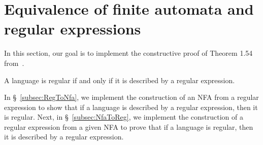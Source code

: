 \section{Equivalence of finite automata and regular expressions}\label{sec:equivalence_regex_fa}

In this section, our goal is to implement the constructive proof of Theorem 1.54 from~\cite{sipser2012}.

\begin{theorem}
    A language is regular if and only if it is described by a regular expression.
\end{theorem}

In \S~\ref{subsec:RegToNfa}, we implement the construction of an NFA from a regular expression 
to show that if a language is described by a regular expression, then it is regular.
Next, in \S~\ref{subsec:NfaToReg}, we implement the construction of a regular expression from a given NFA
to prove that if a language is regular, then it is described by a regular expression.